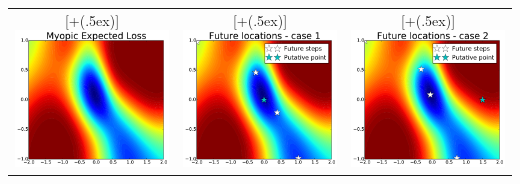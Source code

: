 \documentclass[twoside]{article}
\newcommand*{\addheight}[2][.5ex]{%
  \raisebox{0pt}[\dimexpr\height+(#1)\relax]{#2}%
}
\begin{document}
\begin{table}[t!]
\begin{tabular}{ccc}
      \addheight{\includegraphics[width=54mm]{bo_1step.pdf}} &
      \addheight{\includegraphics[width=54mm]{predicted_locations1.pdf}}  &
      \addheight{\includegraphics[width=54mm]{predicted_locations2.pdf}}
\end{tabular}
\end{table}
\end{document}
